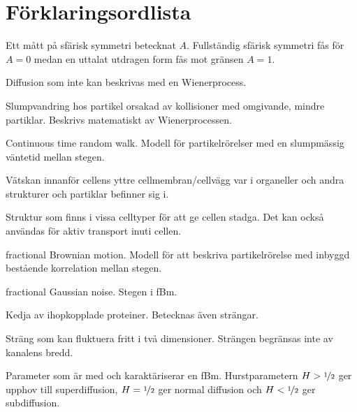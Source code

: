 \chapter*{Förklaringsordlista}


\begin{description}[align=left]

\item[Asfärisitet] Ett mått på sfärisk symmetri betecknat $A$. Fullständig sfärisk symmetri fås för $A=0$ medan en uttalat utdragen form fås mot gränsen $A=1$.

\item[Anomal transport] Diffusion som inte kan beskrivas med en Wienerprocess.

\item[Brownsk rörelse] Slumpvandring hos partikel orsakad av kollisioner med omgivande, mindre partiklar. Beskrivs matematiskt av Wienerprocessen.


\item[CTRW] Continuous time random walk. Modell för partikelrörelser med en slumpmässig väntetid mellan stegen. 

\item[Cytoplasma] Vätskan innanför cellens yttre cellmembran/cellvägg var i organeller och andra strukturer och partiklar befinner sig i.

\item[Cytoskelett] Struktur som finns i vissa celltyper för att ge cellen stadga. Det kan också användas för aktiv transport inuti cellen.


\item[fBm] fractional Brownian motion. Modell för att beskriva partikelrörelse med inbyggd bestående korrelation mellan stegen.

\item[fGn] fractional Gaussian noise. Stegen i fBm.

\item[Filament] Kedja av ihopkopplade proteiner. Betecknas även strängar.

\item[Fri sträng] Sträng som kan fluktuera fritt i två dimensioner. Strängen begränsas inte av kanalens bredd.

\item[Hurstparametern] Parameter som är med och karaktäriserar en fBm. Hurstparametern $H>\nicefrac{1}{2}$ ger upphov till superdiffusion, $H=\nicefrac{1}{2}$ ger normal diffusion och $H<\nicefrac{1}{2}$ ger subdiffusion.


\end{description}
